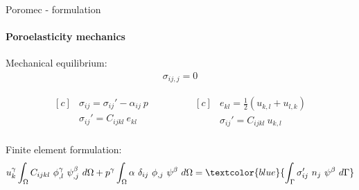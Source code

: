\begin{frame}{Poromec - formulation}
\framesubtitle{Poroelasticity mechanics}
Mechanical equilibrium:
\begin{align*}
  \sigma_{ij,j} = 0
\end{align*}

\begin{equation*}
\begin{aligned}[c]
  &  \sigma_{ij}  = \sigma_{ij}' - \alpha_{ij}\ p  \\
  &  \sigma_{ij}' = C_{ijkl}\ e_{kl} \\
\end{aligned}
\qquad\qquad
\begin{aligned}[c]
    & e_{kl} = \frac{1}{2} ( u_{k,l} + u_{l,k} ) \\
    & \sigma_{ij}' = C_{ijkl}\ u_{k,l}\\
\end{aligned}
\end{equation*}

Finite element formulation:
\begin{align*}   
      u_k^\gamma \int_\Omega C_{ijkl}\ \phi^\gamma_{,l}\ \psi_{,j}^\beta\ d\Omega
    + p^\gamma \int_\Omega \alpha\ \delta_{ij}\ \phi_{,j}\ \psi^\beta\ d\Omega = 
      \textcolor{blue}{\int_\Gamma \sigma_{ij}'\ n_j\ \psi^\beta\ d\Gamma}
\end{align*}
\end{frame}

